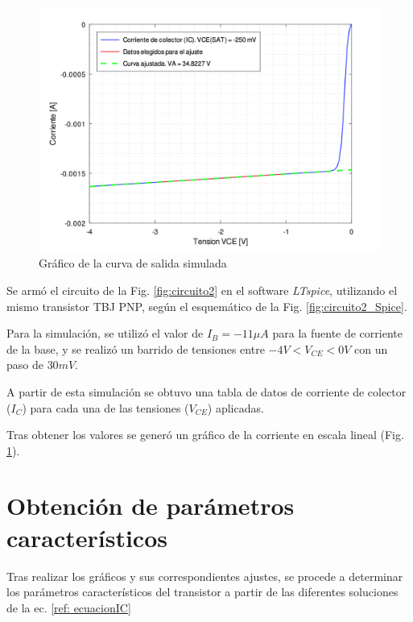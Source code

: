 \documentclass[10pt]{article}
\begin{document}
\setlength{\columnsep}{0.4cm} 

\begin{multicols}{2}
    
    \begin{figure}[H]
        \centering
        \includegraphics[width=1\linewidth]{curvaS.png}
        \caption{Gráfico de la curva de salida simulada}
        \label{fig:curvaSalida}
        \end{figure}

    \columnbreak
    
    \noindent
    Se armó el circuito de la Fig. \ref{fig:circuito2} en el software \textit{LTspice}, utilizando el mismo transistor TBJ PNP, según el esquemático de la Fig. \ref{fig:circuito2_Spice}. 

    Para la simulación, se utilizó el valor de $I_B = -11\mu A$ para la fuente de corriente de la base, y se realizó un barrido de tensiones entre $-4V < V_{CE} < 0V$ con un paso de $30mV$. 
    
    A partir de esta simulación se obtuvo una tabla de datos de corriente de colector ($I_C$) para cada una de las tensiones ($V_{CE}$) aplicadas.

    Tras obtener los valores se generó un gráfico de la corriente en escala lineal (Fig. \ref{fig:curvaSalida}).
\end{multicols}

\section{Obtención de parámetros característicos}
Tras realizar los gráficos y sus correspondientes ajustes, se procede a determinar los parámetros característicos del transistor a partir de las diferentes soluciones de la  ec. \ref{ref: ecuacionIC}
\end{document}
